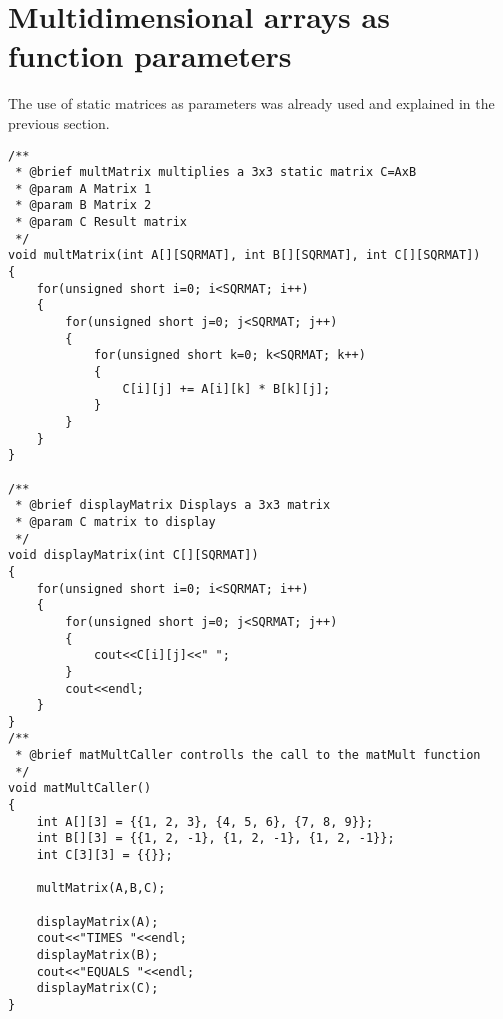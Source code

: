 \documentclass{article}
\begin{document}
\section{Multidimensional arrays as function parameters}

The use of static matrices as parameters was already used and explained in
the previous section. 

\begin{lstlisting}[label=lst_mat_par,caption=Matrix Parameters]
/**
 * @brief multMatrix multiplies a 3x3 static matrix C=AxB
 * @param A Matrix 1
 * @param B Matrix 2
 * @param C Result matrix
 */
void multMatrix(int A[][SQRMAT], int B[][SQRMAT], int C[][SQRMAT])
{
	for(unsigned short i=0; i<SQRMAT; i++)
	{
		for(unsigned short j=0; j<SQRMAT; j++)
		{
			for(unsigned short k=0; k<SQRMAT; k++)
			{
				C[i][j] += A[i][k] * B[k][j];
			}
		}
	}
}

/**
 * @brief displayMatrix Displays a 3x3 matrix
 * @param C matrix to display
 */
void displayMatrix(int C[][SQRMAT])
{
	for(unsigned short i=0; i<SQRMAT; i++)
	{
		for(unsigned short j=0; j<SQRMAT; j++)
		{
			cout<<C[i][j]<<" ";
		}
		cout<<endl;
	}
}
/**
 * @brief matMultCaller controlls the call to the matMult function
 */
void matMultCaller()
{
	int A[][3] = {{1, 2, 3}, {4, 5, 6}, {7, 8, 9}};
	int B[][3] = {{1, 2, -1}, {1, 2, -1}, {1, 2, -1}};
	int C[3][3] = {{}};

	multMatrix(A,B,C);

	displayMatrix(A);
	cout<<"TIMES "<<endl;
	displayMatrix(B);
	cout<<"EQUALS "<<endl;
	displayMatrix(C);
}
\end{lstlisting} 



\end{document}
